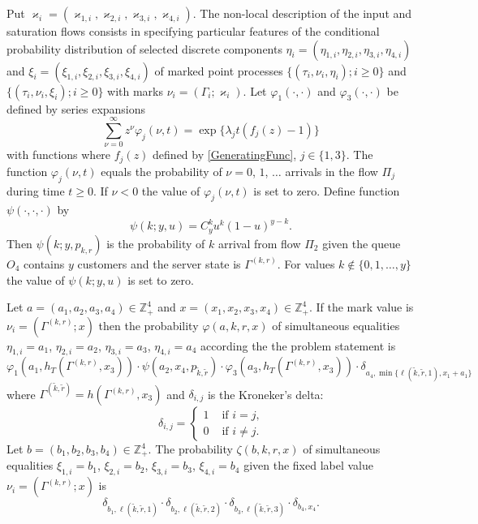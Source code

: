 \documentclass[10pt]{article}
\begin{document}
Put $\varkappa_i=(\varkappa_{1,i},\varkappa_{2,i},\varkappa_{3,i},\varkappa_{4,i})$. The non-local
description of the input and saturation flows consists in specifying particular features of the
 conditional probability distribution of selected discrete components
$\eta_i=(\eta_{1,i},\eta_{2,i}, \eta_{3,i}, \eta_{4,i})$ and $\xi_i=(\xi_{1,i}, \xi_{2,i},
\xi_{3,i}, \xi_{4,i})$ of marked point processes $\{(\tau_i, \nu_i, \eta_i); i\geqslant 0\}$ and
$\{(\tau_i, \nu_i, \xi_i); i\geqslant 0\}$ with marks $\nu_i = (\Gamma_i;\varkappa_i)$. Let
$\varphi_1(\cdot,\cdot)$ and $\varphi_3(\cdot,\cdot)$ be defined by series expansions
\begin{equation*}
\sum_{\nu=0}^{\infty} z^\nu\varphi_j(\nu,t) = \exp\{\lambda_j t (f_j(z)-1)\}
\end{equation*}
with functions where $f_j(z)$ defined by \eqref{GeneratingFunc}, $j \in \{1,3\}$. The function
$\varphi_j(\nu,t)$ equals the probability of  $\nu=0$, $1$, $\ldots${} arrivals in the flow
$\Pi_j$ during time $t \geqslant 0$. If $\nu < 0$ the value of $\varphi_j(\nu,t)$ is set to
zero. Define function $\psi(\cdot,\cdot,\cdot)$ by
\begin{equation*}
\psi(k;y,u)=C_y^k u^k (1-u)^{y-k}.	
\end{equation*}
Then $\psi(k;y,p_{k,r})$ is the probability of $k$ arrival from flow $\Pi_2$ given the queue $O_4$
contains $y$ customers and the server state is $\Gamma^{(k,r)}$. For values $k\not\in\{0, 1, \ldots,
y\}$ the value of $\psi(k;y,u)$ is set to zero.

Let $a=(a_1, a_2, a_3, a_4) \in \mathbb{Z}_+^4$ and $x=(x_1, x_2, x_3, x_4) \in
\mathbb{Z}_+^4$. If the mark value is 
$\nu_i=(\Gamma^{(k,r)}; x)$ then the probability $\varphi(a,k,r,x)$ of simultaneous
equalities  $\eta_{1,i}=a_1$, $\eta_{2,i}=a_2$, $\eta_{3,i}=a_3$, $\eta_{4,i}=a_4$ according the the
problem statement is
\begin{equation*}
\varphi_1(a_1,h_T(\Gamma^{(k,r)},x_3)) \cdot \psi(a_2,x_4, p_{\tilde{k},\tilde{r}}) \cdot \varphi_3(a_3,h_T(\Gamma^{(k,r)},x_3))
\cdot \delta_{a_4,\min{\{\ell{(\tilde{k},\tilde{r},1)}, x_1+a_1}\}}
\label{conditionProbOne}
\end{equation*}
where $\Gamma^{(\tilde{k},\tilde{r})}=h(\Gamma^{(k,r)},x_3)$ and $\delta_{i,j}$ is the Kroneker's delta:
\begin{equation*}
\delta_{i,j}=\begin{cases} 1 &\text{ if $i=j$,}\\0 &\text{ if $i\neq j$.}
\end{cases}
\end{equation*}
Let $b=(b_1, b_2, b_3, b_4) \in \mathbb{Z}_+^4$. The probability $\zeta(b, k, r, x)$  of
simultaneous equalities $\xi_{1,i}=b_1$, $\xi_{2,i}=b_2$, $\xi_{3,i}=b_3$, $\xi_{4,i}=b_4$ given the
fixed label value $\nu_i=(\Gamma^{(k,r)}; x)$ is
\begin{equation*}
\delta_{b_1,\ell(\tilde{k},\tilde{r},1)} \cdot \delta_{b_2,\ell(\tilde{k},\tilde{r},2)} \cdot
\delta_{b_3,\ell(\tilde{k},\tilde{r},3)} \cdot \delta_{b_4,x_4}.
\label{conditionProbTwo}
\end{equation*}
\end{document}

